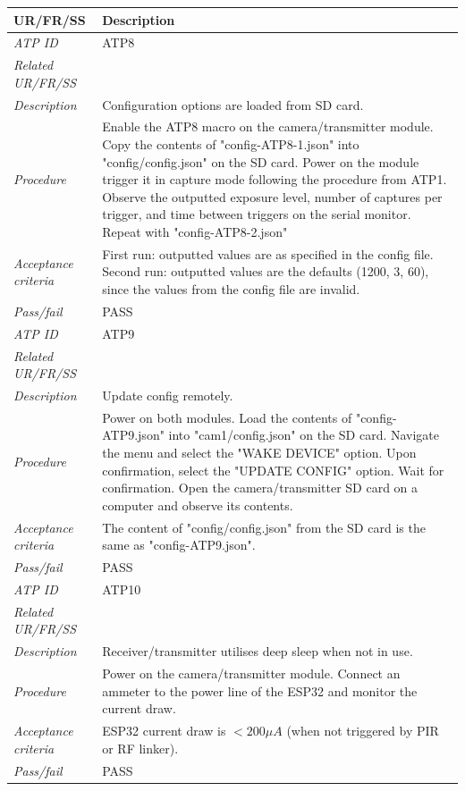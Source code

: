 \documentclass[class=report,11pt,crop=false]{standalone}
\begin{document}
\begin{table}[!ht]
    \centering
    \begin{scriptsize}
    \begin{tabularx}{\textwidth}{|p{} X|}
        
        \hline
        \textbf{UR/FR/SS} & \textbf{Description}\\ \hline

        \textit{ATP ID} & ATP8\\
        \textit{Related UR/FR/SS} & \\
        \textit{Description} & Configuration options are loaded from SD card.\\
        \textit{Procedure} & Enable the ATP8 macro on the camera/transmitter module. Copy the contents of "config-ATP8-1.json" into "config/config.json" on the SD card. Power on the module trigger it in capture mode following the procedure from ATP1. Observe the outputted exposure level, number of captures per trigger, and time between triggers on the serial monitor. Repeat with "config-ATP8-2.json" \\
        \textit{Acceptance criteria} & First run: outputted values are as specified in the config file. Second run: outputted values are the defaults (1200, 3, 60), since the values from the config file are invalid.\\ 
        \textit{Pass/fail} & PASS\\ \hline

        \textit{ATP ID} & ATP9\\
        \textit{Related UR/FR/SS} & \\
        \textit{Description} & Update config remotely.\\
        \textit{Procedure} & Power on both modules. Load the contents of "config-ATP9.json" into "cam1/config.json" on the SD card. Navigate the menu and select the "WAKE DEVICE" option. Upon confirmation, select the "UPDATE CONFIG" option. Wait for confirmation. Open the camera/transmitter SD card on a computer and observe its contents.\\
        \textit{Acceptance criteria} & The content of "config/config.json" from the SD card is the same as "config-ATP9.json".\\ 
        \textit{Pass/fail} & PASS \\ \hline

        \textit{ATP ID} & ATP10\\
        \textit{Related UR/FR/SS} & \\
        \textit{Description} & Receiver/transmitter utilises deep sleep when not in use.\\
        \textit{Procedure} & Power on the camera/transmitter module. Connect an ammeter to the power line of the ESP32 and monitor the current draw. \\
        \textit{Acceptance criteria} & ESP32 current draw is $ < 200 \mu A $ (when not triggered by PIR or RF linker).\\ 
        \textit{Pass/fail} & PASS\\ \hline


\end{tabularx}
\end{scriptsize}
\end{table}
\end{document}

